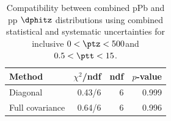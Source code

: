 \begin{table}[htp!]
\centering
\begin{tabular}{|l|r|r|r|}
\hline
Method & $\chi^2$/ndf & ndf & $p$-value \\
\hline
Diagonal & 0.43/6 & 6 & 0.999 \\
Full covariance & 0.64/6 & 6 & 0.996 \\
\hline
\end{tabular}
\caption{Compatibility between combined pPb and pp $\dphitz$ distributions using combined statistical and systematic uncertainties for inclusive $0 < \ptz < 500$\GeV and $0.5 < \ptt < 15$\GeV.}
\label{table:chisq_dphi}
\end{table}
